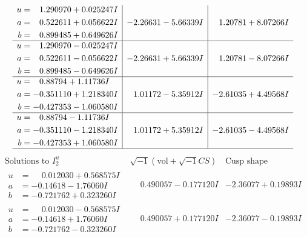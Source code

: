 \documentclass[1p]{elsarticle_modified}
\theoremstyle{definition}
\newcommand{\I}{\sqrt{-1}}
\begin{document}
$$\begin{array}{c|c|c}
\begin{aligned}
u &= \phantom{-}1.290970 + 0.025247 I \\
a &= \phantom{-}0.522611 + 0.056622 I \\
b &= \phantom{-}0.899485 + 0.649626 I\end{aligned}
 & -2.26631 - 5.66339 I & \phantom{-}1.20781 + 8.07266 I \\ \hline\begin{aligned}
u &= \phantom{-}1.290970 - 0.025247 I \\
a &= \phantom{-}0.522611 - 0.056622 I \\
b &= \phantom{-}0.899485 - 0.649626 I\end{aligned}
 & -2.26631 + 5.66339 I & \phantom{-}1.20781 - 8.07266 I \\ \hline\begin{aligned}
u &= \phantom{-}0.88794 + 1.11736 I \\
a &= -0.351110 + 1.218340 I \\
b &= -0.427353 - 1.060580 I\end{aligned}
 & \phantom{-}1.01172 - 5.35912 I & -2.61035 + 4.49568 I \\ \hline\begin{aligned}
u &= \phantom{-}0.88794 - 1.11736 I \\
a &= -0.351110 - 1.218340 I \\
b &= -0.427353 + 1.060580 I\end{aligned}
 & \phantom{-}1.01172 + 5.35912 I & -2.61035 - 4.49568 I\\
 \hline 
 \end{array}$$\newpage$$\begin{array}{c|c|c}  
\text{Solutions to }I^u_{2}& \I (\text{vol} + \sqrt{-1}CS) & \text{Cusp shape}\\
 \hline 
\begin{aligned}
u &= \phantom{-}0.012030 + 0.568575 I \\
a &= -0.14618 - 1.76060 I \\
b &= -0.721762 + 0.323260 I\end{aligned}
 & \phantom{-}0.490057 - 0.177120 I & -2.36077 + 0.19893 I \\ \hline\begin{aligned}
u &= \phantom{-}0.012030 - 0.568575 I \\
a &= -0.14618 + 1.76060 I \\
b &= -0.721762 - 0.323260 I\end{aligned}
 & \phantom{-}0.490057 + 0.177120 I & -2.36077 - 0.19893 I \\ \hline\begin{aligned}

\end{aligned}
\end{array}$$
\end{document}

